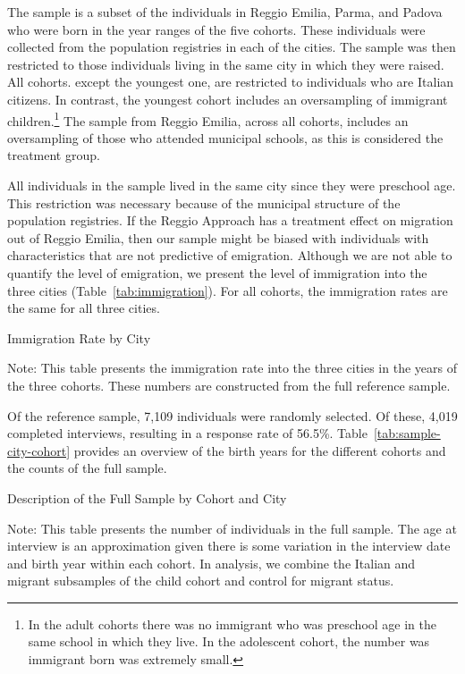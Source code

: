 The sample is a subset of the individuals in Reggio Emilia, Parma, and Padova who were born in the year ranges of the five cohorts.  These individuals were collected from the population registries in each of the cities. The sample was then restricted to those individuals living in the same city in which they were raised. All cohorts. except the youngest one, are restricted to individuals who are Italian citizens. In contrast, the youngest cohort includes an oversampling of immigrant children.\footnote{In the adult cohorts there was no immigrant who was preschool age in the same school in which they live. In the adolescent cohort, the number was immigrant born was extremely small.} The sample from Reggio Emilia, across all cohorts, includes an oversampling of those who attended municipal schools, as this is considered the treatment group.

All individuals in the sample lived in the same city since they were preschool age. This restriction was necessary because of the municipal structure of the population registries. If the Reggio Approach has a treatment effect on migration out of Reggio Emilia, then our sample might be biased with individuals with characteristics that are not predictive of emigration. Although we are not able to quantify the level of emigration, we present the level of immigration into the three cities (Table~\ref{tab:immigration}). For all cohorts, the immigration rates are the same for all three cities. 

\begin{table}[H]
\centering
\begin{threeparttable}
	\caption{Immigration Rate by City}\label{tab:immigration}
	
\begin{tablenotes}
\footnotesize
Note: This table presents the immigration rate into the three cities in the years of the three cohorts. These numbers are constructed from the full reference sample.
\end{tablenotes}
\end{threeparttable}
\end{table}

Of the reference sample, 7,109 individuals were randomly selected. Of these, 4,019 completed interviews, resulting in a response rate of 56.5\%. Table~\ref{tab:sample-city-cohort} provides an overview of the birth years for the different cohorts and the counts of the full sample.
\begin{table}[H]
\centering
\begin{threeparttable}
	\caption{Description of the Full Sample by Cohort and City}\label{tab:sample-city-cohort}
	
\begin{tablenotes}
\footnotesize
Note: This table presents the number of individuals in the full sample. The age at interview is an approximation given there is some variation in the interview date and birth year within each cohort. In analysis, we combine the Italian and migrant subsamples of the child cohort and control for migrant status.
\end{tablenotes}
\end{threeparttable}
\end{table}

